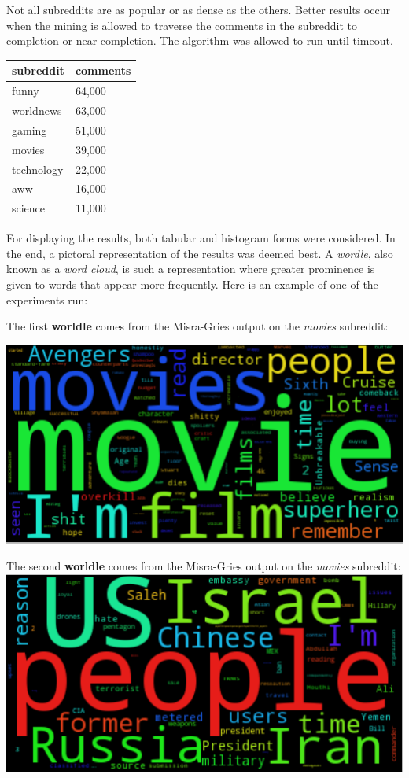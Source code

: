 \documentclass[12pt]{article}
\numberwithin{equation}{section}
\begin{document}
Not all subreddits are as popular or as dense as the others.  Better results occur when the mining is allowed to traverse the comments in the subreddit to completion or near completion.  The algorithm was allowed to run until timeout.  

\begin{table}[h!]
\begin{tabular}{ll}
\textbf{subreddit} & \textbf{comments} \\
 \hline
funny              & 64,000           \\
worldnews          & 63,000           \\
gaming             & 51,000           \\
movies             & 39,000           \\
technology         & 22,000           \\
aww                & 16,000           \\
science            & 11,000          
\end{tabular}
\end{table}



For displaying the results, both tabular and histogram forms were considered.  In the end, a pictoral representation of the results was deemed best.  A \textit{wordle}, also known as a \textit{word cloud}, is such a representation where  greater prominence is given to words that appear more frequently.  Here is an example of one of the experiments run: 

\centering
The first \textbf{worldle} comes from the Misra-Gries output on the \textit{movies} subreddit:

\includegraphics[scale=.5]{movies.png}

The second \textbf{worldle} comes from the Misra-Gries output on the \textit{movies} subreddit:
\centering
\includegraphics[scale=.5]{worldnews.png}
\end{document}
